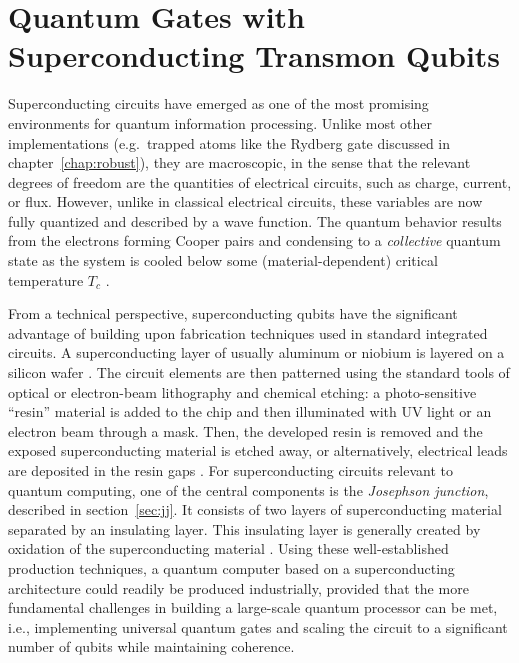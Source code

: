 \chapter{Quantum Gates with Superconducting Transmon Qubits}
\label{chap:transmon}

Superconducting circuits have emerged as one of the most promising
environments for quantum information processing. Unlike most other
implementations (e.g.\ trapped atoms like the Rydberg gate discussed in
chapter~\ref{chap:robust}), they are macroscopic, in the sense that the relevant
degrees of freedom are the quantities of electrical circuits, such as
charge, current, or flux. However, unlike in classical electrical circuits,
these variables are now fully quantized and described by a wave function. The
quantum behavior results from the electrons forming Cooper pairs and condensing
to a \emph{collective} quantum state as the system is cooled below some
(material-dependent) critical temperature $T_c$ \cite{TinkhamBook}.

From a technical perspective, superconducting qubits have the significant
advantage of building upon fabrication techniques used in standard integrated
circuits. A superconducting layer of usually aluminum or niobium is layered on
a silicon wafer
\cite{DevoretQIP2004, FrunzioITAS2005}.
The circuit elements are then patterned using the standard tools of optical or
electron-beam lithography and chemical etching: a photo-sensitive ``resin''
material is added to the chip and then illuminated with UV light or an electron
beam through a mask. Then, the developed resin is removed and the
exposed superconducting material is etched away, or alternatively, electrical
leads are deposited in the resin gaps \cite{HirstSCHandbook2003}.
For superconducting circuits relevant to quantum computing, one of the central
components is the \emph{Josephson junction}, described in
section~\ref{sec:jj}. It consists of two layers of superconducting material
separated by an insulating layer. This insulating layer is generally created by
oxidation of the superconducting material \cite{DevoretQIP2004,
FrunzioITAS2005}. Using these well-established production techniques,
a quantum computer based on a superconducting architecture could readily be
produced industrially, provided that the more fundamental challenges in building
a large-scale quantum processor can be met, i.e., implementing universal quantum
gates and scaling the circuit to a significant number of qubits while
maintaining coherence.

